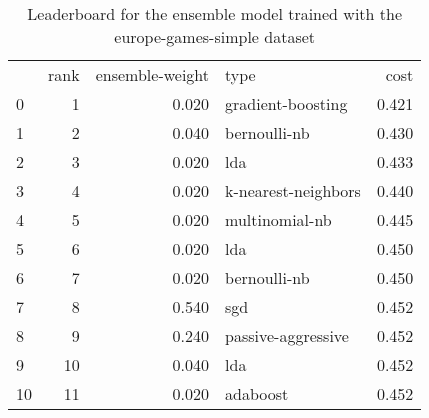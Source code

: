 \begin{table}[]
	\centering
	\begin{tabular}{lrrlr}
		   & rank & ensemble-weight & type                & cost  \\
		0  & 1    & 0.020           & gradient-boosting   & 0.421 \\
		1  & 2    & 0.040           & bernoulli-nb        & 0.430 \\
		2  & 3    & 0.020           & lda                 & 0.433 \\
		3  & 4    & 0.020           & k-nearest-neighbors & 0.440 \\
		4  & 5    & 0.020           & multinomial-nb      & 0.445 \\
		5  & 6    & 0.020           & lda                 & 0.450 \\
		6  & 7    & 0.020           & bernoulli-nb        & 0.450 \\
		7  & 8    & 0.540           & sgd                 & 0.452 \\
		8  & 9    & 0.240           & passive-aggressive  & 0.452 \\
		9  & 10   & 0.040           & lda                 & 0.452 \\
		10 & 11   & 0.020           & adaboost            & 0.452 \\
	\end{tabular}

	\caption{Leaderboard for the ensemble model trained with the europe-games-simple dataset}
	\label{tab:lb-europe-games-simple-autoencode}
\end{table}

